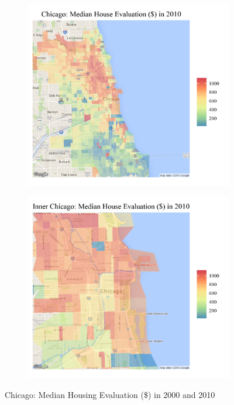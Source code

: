 \documentclass[11pt]{asaproc}
\newcommand{\1}{\mathbb{1}}
\begin{document}
\begin{figure}[h!]
\begin{subfigure}{.45\textwidth}
\end{subfigure}
\label{fig:chicago2000}
\begin{subfigure}{.45\textwidth}
  \centering
\includegraphics[scale=.15]{figures/c_2010.png}
\end{subfigure}%
\begin{subfigure}{.45\textwidth}
  \centering
\includegraphics[scale=.15]{figures/c_2010_inner.png}
\end{subfigure}
\caption[Chicago Median Housing Evaluation, 2000-2010]{Chicago: Median Housing Evaluation (\$) in 2000 and 2010}
\label{fig:chicago2000}
\end{figure}
\end{document}
